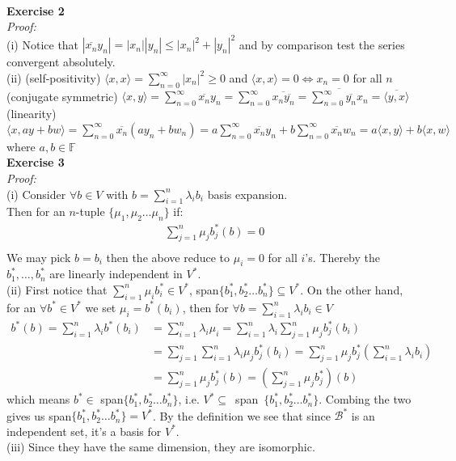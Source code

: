 \documentclass[12pt]{article}
\def\dotp#1#2{\langle#1,#2\rangle}
\def\ss#1#2{\sum_{#1=1}^{#2}}
\def\lam{\lambda}
\def\vec#1{\{#1_1,#1_2\ldots#1_n\}}
\begin{document}
\\[1em]
{\bf Exercise 2}\\
{\it Proof:}\\
(i) Notice that $|\overline{x_n}y_n|=|x_n||y_n|\leq|x_n|^2+|y_n|^2$ and by comparison test the series convergent absolutely.\\[0.5 em]
(ii) (self-positivity) $ \dotp xx=\sum_{n=0}^{\infty}{|x_n|}^2\geq0$ and $\dotp xx=0\iff x_n=0$ for all $n$\\
(conjugate symmetric) $ \dotp xy=\sum_{n=0}^{\infty}{\overline{x_n}y_n}=\sum_{n=0}^{\infty}{\overline{x_n\overline{y_n}}}=\overline{\sum_{n=0}^{\infty}{\overline{y_n}x_n}}=\overline{\dotp yx}$\\
(linearity) $\dotp x{ay+bw}=\sum_{n=0}^{\infty}\overline{x_n}(ay_n+bw_n)=a\sum_{n=0}^{\infty}\overline{x_n}y_n+b\sum_{n=0}^{\infty}\overline{x_n}w_n=a\dotp xy+b\dotp xw$ where $a,b\in\mathbb{F}$
\\[1em]
{\bf Exercise 3}\\
{\it Proof:}\\
(i) Consider $\forall b\in V$ with $b=\ss i n {\lam}_ib_i$ basis expansion.\\
Then for an $n$-tuple $\vec \mu$ if:
\begin{align*}
&\ss j n \mu_jb_j^{*}(b)=0\\
\end{align*}
We may pick $b=b_i$ then the above reduce to $\mu_i=0$ for all $i$'s. Thereby the $b_1^*,\ldots,b_n^*$ are linearly independent in $V^*$.\\[0.5 em]
(ii) First notice that $\ss i n \mu_ib_i^*\in V^*$, span$\vec {b^*}\subseteq V^*$. On the other hand, for an $ \forall b^*\in V^*$ we set $\mu_i=b^*(b_i)$, then for $ \forall b=\sum_{i=1}^n\lam_ib_i \in V$
\begin{align*}
b^*(b)=\sum_{i=1}^{n}\lam_ib^*(b_i)
&=\sum_{i=1}^{n}\lam_i\mu_i
=\sum_{i=1}^{n}\lam_i\sum_{j=1}^n\mu_jb_j^*(b_i)\\
&=\sum_{j=1}^n\sum_{i=1}^n\lam_i\mu_jb_j^*(b_i)=\sum_{j=1}^n\mu_jb_j^*\left(\sum_{i=1}^n\lam_ib_i\right)\\
&=\sum_{j=1}^n\mu_jb_j^*(b)=\left(\sum_{j=1}^n\mu_jb_j^*\right)(b)
\end{align*}
which means $b^*\in$ span$\vec {b^*}$, i.e. $V^*\subseteq$~span~$\vec {b^*}$. Combing the two gives us span$\vec {b^*}=V^*$. By the definition we see that since $\mathcal{B}^*$ is an independent set, it's a basis for $V^*$.\\[0.5 em]
(iii) Since they have the same dimension, they are isomorphic.\\[0.5 em]
\end{document}
